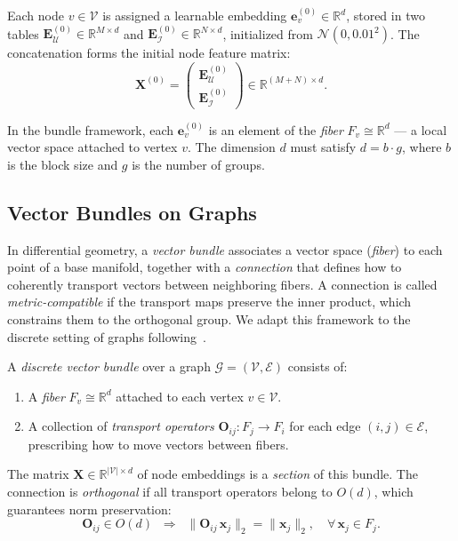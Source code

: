 Each node $v \in \mathcal{V}$ is assigned a learnable embedding $\mathbf{e}_v^{(0)} \in \mathbb{R}^d$, stored in two tables $\mathbf{E}_{\mathcal{U}}^{(0)} \in \mathbb{R}^{M \times d}$ and $\mathbf{E}_{\mathcal{I}}^{(0)} \in \mathbb{R}^{N \times d}$, initialized from $\mathcal{N}(0, 0.01^2)$. The concatenation forms the initial node feature matrix:
\begin{equation}
    \mathbf{X}^{(0)} = \begin{pmatrix} \mathbf{E}_{\mathcal{U}}^{(0)} \\ \mathbf{E}_{\mathcal{I}}^{(0)} \end{pmatrix} \in \mathbb{R}^{(M+N) \times d}.
\end{equation}

In the bundle framework, each $\mathbf{e}_v^{(0)}$ is an element of the \textit{fiber} $F_v \cong \mathbb{R}^d$ --- a local vector space attached to vertex $v$. The dimension $d$ must satisfy $d = b \cdot g$, where $b$ is the block size and $g$ is the number of groups.


\subsection{Vector Bundles on Graphs}

In differential geometry, a \textit{vector bundle} associates a vector space (\textit{fiber}) to each point of a base manifold, together with a \textit{connection} that defines how to coherently transport vectors between neighboring fibers. A connection is called \textit{metric-compatible} if the transport maps preserve the inner product, which constrains them to the orthogonal group. We adapt this framework to the discrete setting of graphs following~\cite{singer2012vector, kenlay2021stability}.

A \textit{discrete vector bundle} over a graph $\mathcal{G} = (\mathcal{V}, \mathcal{E})$ consists of:
\begin{enumerate}
    \item A \textit{fiber} $F_v \cong \mathbb{R}^d$ attached to each vertex $v \in \mathcal{V}$.
    \item A collection of \textit{transport operators} $\mathbf{O}_{ij}: F_j \to F_i$ for each edge $(i, j) \in \mathcal{E}$, prescribing how to move vectors between fibers.
\end{enumerate}
The matrix $\mathbf{X} \in \mathbb{R}^{|\mathcal{V}| \times d}$ of node embeddings is a \textit{section} of this bundle. The connection is \textit{orthogonal} if all transport operators belong to $O(d)$, which guarantees norm preservation:
\begin{equation}
    \mathbf{O}_{ij} \in O(d) \;\; \Longrightarrow \;\; \|\mathbf{O}_{ij} \, \mathbf{x}_j\|_2 = \|\mathbf{x}_j\|_2, \quad \forall \, \mathbf{x}_j \in F_j.
\end{equation}

